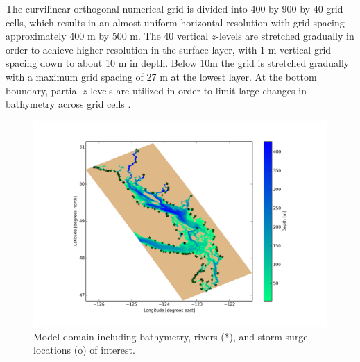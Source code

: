 \documentclass[pdftex,10pt]{article}
\begin{document}
The curvilinear orthogonal numerical grid is divided into 400 by 900 by 40 grid cells, which results in an almost uniform horizontal resolution with grid spacing approximately 400 m by 500 m. The 40 vertical $z$-levels are stretched gradually in order to achieve higher resolution in the surface layer, with 1 m vertical grid spacing down to about 10 m in depth. Below 10m the grid is stretched gradually with a maximum grid spacing of 27 m at the lowest layer. At the bottom boundary, partial $z$-levels are utilized in order to limit large changes in bathymetry across grid cells \citep{madec2008nemo}. 


\begin{figure}[h]
\centering
\includegraphics[scale=0.5]{Figures/bathy.png}
\caption{Model domain including bathymetry, rivers (*), and storm surge locations (o) of interest.}\label{fig:domain}
\end{figure}
\end{document}
